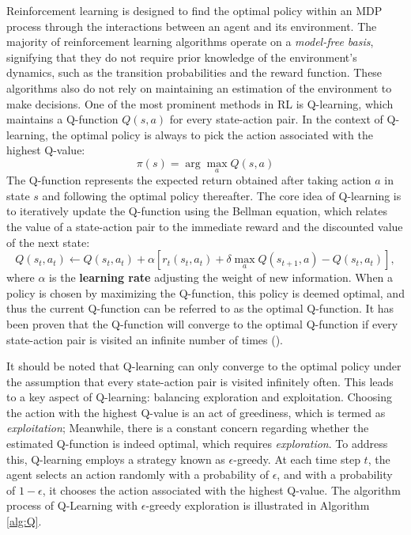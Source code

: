\documentclass[mnsc,nonblindrev]{workingpaper}
\begin{document}
Reinforcement learning is designed to find the optimal policy within an MDP process through the interactions between an agent and its environment. The majority of reinforcement learning algorithms operate on a \textit{model-free basis}, signifying that they do not require prior knowledge of the environment's dynamics, such as the transition probabilities and the reward function. These algorithms also do not rely on maintaining an estimation of the environment to make decisions. One of the most prominent methods in RL is Q-learning, which maintains a Q-function $Q(s,a)$ for every state-action pair. In the context of Q-learning, the optimal policy is always to pick the action associated with the highest Q-value:
\[
    \pi(s)=\arg\max_aQ(s,a) 
\]
 The Q-function represents the expected return obtained after taking action $a$ in state $s$ and following the optimal policy thereafter. The core idea of Q-learning is to iteratively update the Q-function using the Bellman equation, which relates the value of a state-action pair to the immediate reward and the discounted value of the next state:
 \begin{equation}
	Q(s_t,a_t)\leftarrow Q(s_t,a_t)+\alpha[r_{t}(s_t,a_t)+\delta\max_aQ(s_{t+1},a)-Q(s_t,a_t)],
 \end{equation}
 where $\alpha$ is the \textbf{learning rate} adjusting the weight of new information. When a policy is chosen by maximizing the Q-function, this policy is deemed optimal, and thus the current Q-function can be referred to as the optimal Q-function. It has been proven that the Q-function will converge to the optimal Q-function if every state-action pair is visited an infinite number of times (\cite{melo2001convergence}).

It should be noted that Q-learning can only converge to the optimal policy under the assumption that every state-action pair is visited infinitely often. This leads to a key aspect of Q-learning: balancing exploration and exploitation. Choosing the action with the highest Q-value is an act of greediness, which is termed as \textit{exploitation}; Meanwhile, there is a constant concern regarding whether the estimated Q-function is indeed optimal, which requires \textit{exploration}. To address this, Q-learning employs a strategy known as $\epsilon$-greedy. At each time step $t$, the agent selects an action randomly with a probability of $\epsilon$, and with a probability of $1-\epsilon$, it chooses the action associated with the highest Q-value. The algorithm process of Q-Learning with $\epsilon$-greedy exploration is illustrated in Algorithm \ref{alg:Q}.
\end{document}
